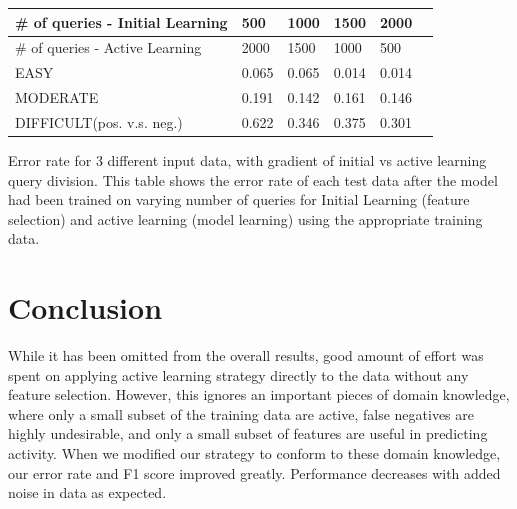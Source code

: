 \documentclass[paper=a4, fontsize=11pt]{scrartcl}
\numberwithin{equation}{section}    %
\numberwithin{figure}{section}      %
\numberwithin{table}{section}       %
\numberwithin{equation}{section}    %
\numberwithin{figure}{section}      %
\numberwithin{table}{section}       %
\begin{document}
\begin{minipage}{\linewidth}
\smallskip
\centering
{} \label{errortable} 
\begin{tabular}{ p{2in} C{.85in} *4{C{.7in}}}\toprule[1.5pt]
\# of queries - Initial Learning & 500 & 1000 & 1500 & 2000  \\ \toprule[1.5pt]
\# of queries - Active Learning & 2000 & 1500 & 1000 & 500  \\ \bottomrule[1.25pt]
EASY                          & 0.065                              & 0.065                               & 0.014                               & 0.014                               \\
MODERATE                      & 0.191                              & 0.142                               & 0.161                               & 0.146                               \\
DIFFICULT(pos. v.s. neg.)     & 0.622                              & 0.346                               & 0.375                               & 0.301                               \\
\bottomrule[1.25pt]
\end{tabular} \par \bigskip 
Error rate for 3 different input data, with gradient of initial vs active learning query division.
This table shows the error rate of each test data after the model had been trained on varying number of queries for Initial Learning (feature selection) and active learning (model learning) using the appropriate training data. 
\end{minipage}
\FloatBarrier



\section{Conclusion}
While it has been omitted from the overall results, good amount of effort was spent on applying active learning strategy directly to the data without any feature selection. However, this ignores an important pieces of domain knowledge, where only a small subset of the training data are active, false negatives are highly undesirable, and only a small subset of features are useful in predicting activity. When we modified our strategy to conform to these domain knowledge, our error rate and F1 score improved greatly. Performance decreases with added noise in data as expected. 
\end{document}

